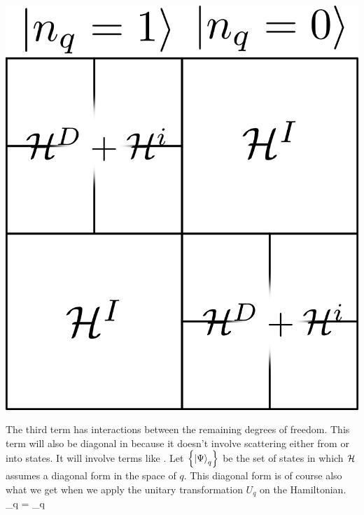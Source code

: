 \documentclass[14pt]{extarticle}
\numberwithin{equation}{section}
\begin{document}
\hspace*{20pt}\begin{minipage}{200pt}
\begin{center}
\includegraphics[scale=0.7]{ham.png}
\end{center}
\end{minipage}
\pb The third term  has interactions between the remaining degrees of freedom.
This term will also be diagonal in  because it doesn't involve scattering either from or into  states.
It will involve terms like .
\pb Let \(\left\{{\ket{\Psi}_q}\right\}\) be the set of states in which \(\mathcal{H}\) assumes a diagonal form in the space of \(q\). This diagonal form is of course also what we get when we apply the unitary transformation \(U_q\) on the Hamiltonian.
\beq[tanjiro]
\ham \ket{\Psi}_q = \tilde \ham \ket{\Psi}_q
\eeq
\end{document}

